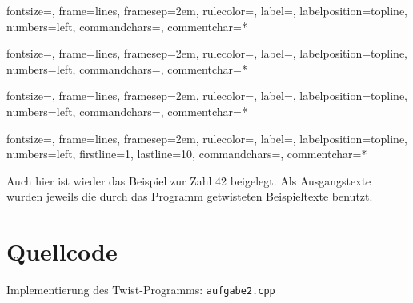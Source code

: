 \documentclass[a4paper, notitlepage, 12pt]{scrartcl}
\newenvironment{longlisting}{\captionsetup{type=listing}}{}
\begin{document}
%
{fontsize=\footnotesize,
	frame=lines,  %
	framesep=2em, %
	rulecolor=\color{Gray},
	label=,
	labelposition=topline,
	numbers=left,
	commandchars=\|\(\), %
	commentchar=*        %
}
\begingroup
{}
\endgroup

%
{fontsize=\footnotesize,
	frame=lines,  %
	framesep=2em, %
	rulecolor=\color{Gray},
	label=,
	labelposition=topline,
	numbers=left,
	commandchars=\|\(\), %
	commentchar=*        %
}
\begingroup
{}
\endgroup

%
{fontsize=\footnotesize,
	frame=lines,  %
	framesep=2em, %
	rulecolor=\color{Gray},
	label=,
	labelposition=topline,
	numbers=left,
	commandchars=\|\(\), %
	commentchar=*        %
}
\begingroup
{}
\endgroup

%
{fontsize=\footnotesize,
	frame=lines,  %
	framesep=2em, %
	rulecolor=\color{Gray},
	label=,
	labelposition=topline,
	numbers=left,
	firstline=1,
	lastline=10,
	commandchars=\|\(\), %
	commentchar=*        %
}
\begingroup
{}
\endgroup

Auch hier ist wieder das Beispiel zur Zahl 42 beigelegt. Als Ausgangstexte wurden jeweils die durch das Programm getwisteten Beispieltexte benutzt.

\section{Quellcode}
 \renewcommand{\listingscaption}{Quellcode}

 \begin{longlisting}
 \caption{Implementierung des Twist-Programms: \texttt{aufgabe2.cpp}}
 \end{longlisting}

 
\end{document}
